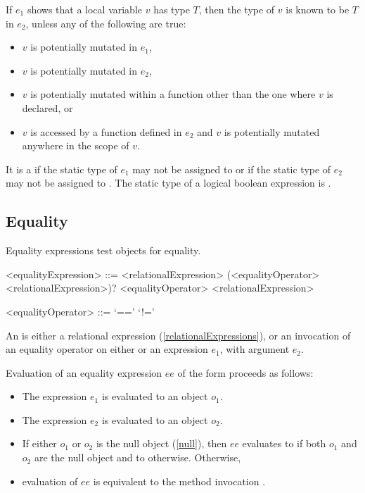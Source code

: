 \documentclass[makeidx]{article}
\begin{document}
{\LMHash{}%
If $e_1$ shows that a local variable $v$ has type $T$,
then the type of $v$ is known to be $T$ in $e_2$,
unless any of the following are true:
\begin{itemize}
\item $v$ is potentially mutated in $e_1$,
\item $v$ is potentially mutated in $e_2$,
\item $v$ is potentially mutated within a function other
  than the one where $v$ is declared, or
\item $v$ is accessed by a function defined in $e_2$ and
  $v$ is potentially mutated anywhere in the scope of $v$.
\end{itemize}

\LMHash{}%
It is a  if
the static type of $e_1$ may not be assigned to 
or if the static type of $e_2$ may not be assigned to .
The static type of a logical boolean expression is .


\subsection{Equality}

\LMHash{}%
Equality expressions test objects for equality.

\begin{grammar}
<equalityExpression> ::= \gnewline{}
  <relationalExpression> (<equalityOperator> <relationalExpression>)?
  \alt \SUPER{} <equalityOperator> <relationalExpression>

<equalityOperator> ::= `=='
  \alt `!='
\end{grammar}

\LMHash{}%
An  is either a relational expression
(\ref{relationalExpressions}),
or an invocation of an equality operator on either \SUPER{}
or an expression $e_1$, with argument $e_2$.

\LMHash{}%
Evaluation of an equality expression $ee$ of the form 
proceeds as follows:
\begin{itemize}
\item The expression $e_1$ is evaluated to an object $o_1$.
\item The expression $e_2$ is evaluated to an object $o_2$.
\item If either $o_1$ or $o_2$ is the null object (\ref{null}),
  then $ee$ evaluates to \TRUE{} if both $o_1$ and $o_2$ are the null object
  and to \FALSE{} otherwise.
Otherwise,
\item evaluation of $ee$ is equivalent to the method invocation
  .
\end{itemize}

}
\end{document}
